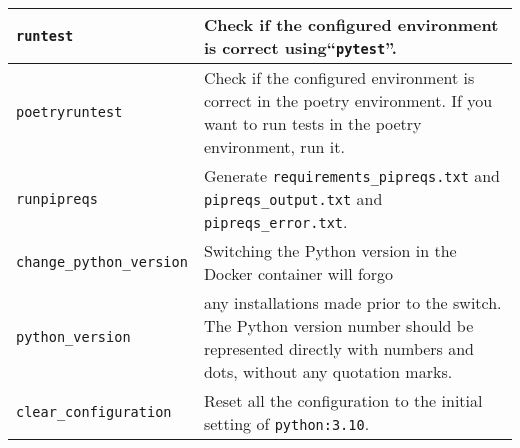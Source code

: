 \begin{table}[htbp]
\begin{tabular}{|l|p{9cm}|}
        \hline
        \texttt{runtest} & Check if the configured environment is correct using``\texttt{pytest}''. \\
        \hline
        \texttt{poetryruntest} & Check if the configured environment is correct in the poetry environment. If you want to run tests in the poetry environment, run it. \\
        \hline
        \texttt{runpipreqs} & Generate \texttt{requirements\_pipreqs.txt} and \texttt{pipreqs\_output.txt} and \texttt{pipreqs\_error.txt}.\\
        \hline
        \texttt{change\_python\_version} & Switching the Python version in the Docker container will forgo\\
        \texttt{python\_version} & any installations made prior to the switch. The Python version number should be represented directly with numbers and dots, without any quotation marks. \\
        \hline
        \texttt{clear\_configuration} & Reset all the configuration to the initial setting of \texttt{python:3.10}. \\
        \hline
    \end{tabular}
    \label{tab:command_list}
\end{table}